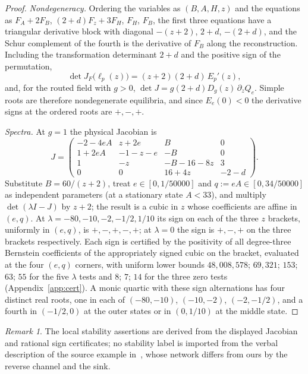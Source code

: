 \documentclass[11pt,a4paper]{article}
\theoremstyle{plain}
\theoremstyle{definition}
\theoremstyle{remark}
\newtheorem{remark}[theorem]{Remark}
\begin{document}
\begin{proof}
\emph{Nondegeneracy.} Ordering the variables as $(B,A,H,z)$ and the equations as $F_A+2F_B$, $(2+d)F_z+3F_H$, $F_H$, $F_B$, the first three equations have a triangular derivative block with diagonal $-(z+2)$, $2+d$, $-(2+d)$, and the Schur complement of the fourth is the derivative of $F_B$ along the reconstruction. Including the transformation determinant $2+d$ and the positive sign of the permutation,
\begin{equation}\label{eq:det}
\det J_F\bigl(\ell_p(z)\bigr)=(z+2)(2+d)\,E_p'(z),
\end{equation}
and, for the routed field with $g>0$, $\det J=g(2+d)D_g(z)\,\partial_zQ_e$. Simple roots are therefore nondegenerate equilibria, and since $E_e(0)<0$ the derivative signs at the ordered roots are $+,-,+$.

\emph{Spectra.} At $g=1$ the physical Jacobian is
\begin{equation}\label{eq:J}
J=\begin{pmatrix}
-2-4eA&z+2e&B&0\\ 1+2eA&-1-z-e&-B&0\\ 1&-z&-B-16-8z&3\\ 0&0&16+4z&-2-d
\end{pmatrix}.
\end{equation}
Substitute $B=60/(z+2)$, treat $e\in[0,1/50000]$ and $q:=eA\in[0,34/50000]$ as independent parameters (at a stationary state $A<33$), and multiply $\det(\lambda I-J)$ by $z+2$; the result is a cubic in $z$ whose coefficients are affine in $(e,q)$. At $\lambda=-80,-10,-2,-1/2,1/10$ its sign on each of the three $z$ brackets, uniformly in $(e,q)$, is $+,-,+,-,+$; at $\lambda=0$ the sign is $+,-,+$ on the three brackets respectively. Each sign is certified by the positivity of all degree-three Bernstein coefficients of the appropriately signed cubic on the bracket, evaluated at the four $(e,q)$ corners, with uniform lower bounds $48{,}008{,}578$; $69{,}321$; $153$; $63$; $55$ for the five $\lambda$ tests and $8$; $7$; $14$ for the three zero tests (Appendix~\ref{app:cert}). A monic quartic with these sign alternations has four distinct real roots, one in each of $(-80,-10)$, $(-10,-2)$, $(-2,-1/2)$, and a fourth in $(-1/2,0)$ at the outer states or in $(0,1/10)$ at the middle state.
\end{proof}

\begin{remark}
The local stability assertions are derived from the displayed Jacobian and rational sign certificates; no stability label is imported from the verbal description of the source example in~\cite{nandan2026}, whose network differs from ours by the reverse channel and the sink.
\end{remark}
\end{document}
